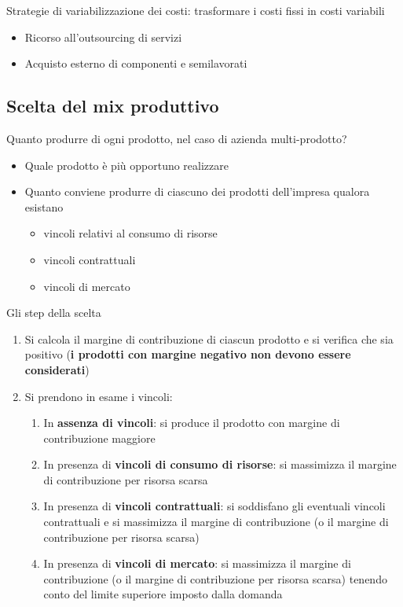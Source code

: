 \documentclass[../main.tex]{subfiles}
\begin{document}
Strategie di variabilizzazione dei costi: trasformare i costi fissi in costi variabili
\begin{itemize}
    \item Ricorso all'outsourcing di servizi
    \item Acquisto esterno di componenti e semilavorati
\end{itemize}


\subsection{Scelta del mix produttivo}

Quanto produrre di ogni prodotto, nel caso di azienda multi-prodotto?

\begin{itemize}
    \item Quale prodotto è più opportuno realizzare
    \item Quanto conviene produrre di ciascuno dei prodotti dell'impresa qualora esistano
        \begin{itemize}
            \item vincoli relativi al consumo di risorse
            \item vincoli contrattuali
            \item vincoli di mercato
        \end{itemize}
\end{itemize}

Gli step della scelta
\begin{enumerate}
    \item Si calcola il margine di contribuzione di ciascun prodotto e si verifica che sia positivo (\textbf{i prodotti con margine negativo non devono essere considerati})
    \item Si prendono in esame i vincoli:
        \begin{enumerate}
            \item In \textbf{assenza di vincoli}: si produce il prodotto con margine di contribuzione maggiore
            \item In presenza di \textbf{vincoli di consumo di risorse}: si massimizza il margine di contribuzione per risorsa scarsa
            \item In presenza di \textbf{vincoli contrattuali}: si soddisfano gli eventuali vincoli contrattuali e si massimizza il margine di contribuzione (o il margine di contribuzione per risorsa scarsa)
            \item In presenza di \textbf{vincoli di mercato}: si massimizza il margine di contribuzione (o il margine di contribuzione per risorsa scarsa) tenendo conto del limite superiore imposto dalla domanda
        \end{enumerate}
\end{enumerate}
\end{document}
